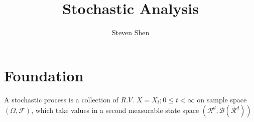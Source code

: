 \documentclass[a4paper, 12pt]{article}
\title{\textbf{Stochastic Analysis}}
\author{Steven Shen}
\begin{document}
\maketitle

\section{Foundation}
A stochastic process is a collection of $R.V.$ $X = {X_t; 0 \leq t < \infty}$ on sample space $(\Omega, \mathcal{F})$, which take values in a second measurable state space $(\mathcal{R}^d, \mathcal{B}(\mathcal{R}^d))$
\end{document}
